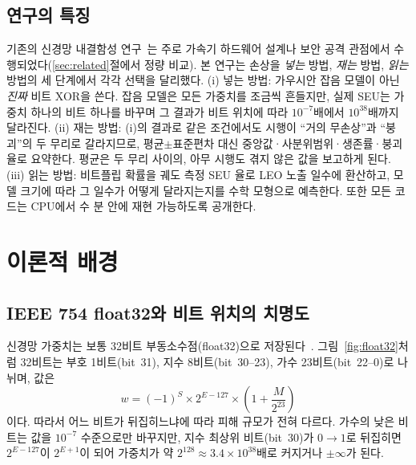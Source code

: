 \documentclass[11pt,a4paper]{article}
\begin{document}
\subsection{연구의 특징}
기존의 신경망 내결함성 연구~\citep{li2017,reagen2018,chen2019,hoang2020,hong2019,stutz2021}는 주로 가속기 하드웨어 설계나 보안 공격 관점에서 수행되었다(\ref{sec:related}절에서 정량 비교). 본 연구는 손상을 \emph{넣는} 방법, \emph{재는} 방법, \emph{읽는} 방법의 세 단계에서 각각 선택을 달리했다. (i) 넣는 방법: 가우시안 잡음 모델이 아닌 \emph{진짜} 비트 XOR을 쓴다. 잡음 모델은 모든 가중치를 조금씩 흔들지만, 실제 SEU는 가중치 하나의 비트 하나를 바꾸며 그 결과가 비트 위치에 따라 $10^{-7}$배에서 $10^{38}$배까지 달라진다. (ii) 재는 방법: (i)의 결과로 같은 조건에서도 시행이 ``거의 무손상''과 ``붕괴''의 두 무리로 갈라지므로, 평균$\pm$표준편차 대신 중앙값·사분위범위·생존률·붕괴율로 요약한다. 평균은 두 무리 사이의, 아무 시행도 겪지 않은 값을 보고하게 된다. (iii) 읽는 방법: 비트플립 확률을 궤도 측정 SEU 율로 LEO 노출 일수에 환산하고, 모델 크기에 따라 그 일수가 어떻게 달라지는지를 수학 모형으로 예측한다. 또한 모든 코드는 CPU에서 수 분 안에 재현 가능하도록 공개한다.

\section{이론적 배경}

\subsection{IEEE 754 float32와 비트 위치의 치명도}
\label{sec:float32}
신경망 가중치는 보통 32비트 부동소수점(float32)으로 저장된다~\citep{ieee754}. 그림~\ref{fig:float32}처럼 32비트는 부호 1비트(bit~31), 지수 8비트(bit~30--23), 가수 23비트(bit~22--0)로 나뉘며, 값은
\begin{equation}
  w = (-1)^{S}\times 2^{E-127}\times\left(1+\frac{M}{2^{23}}\right)
  \label{eq:float32}
\end{equation}
이다. 따라서 어느 비트가 뒤집히느냐에 따라 피해 규모가 전혀 다르다. 가수의 낮은 비트는 값을 $10^{-7}$ 수준으로만 바꾸지만, 지수 최상위 비트(bit~30)가 $0\to1$로 뒤집히면 $2^{E-127}$이 $2^{E+1}$이 되어 가중치가 약 $2^{128}\approx3.4\times10^{38}$배로 커지거나 $\pm\infty$가 된다.
\end{document}
